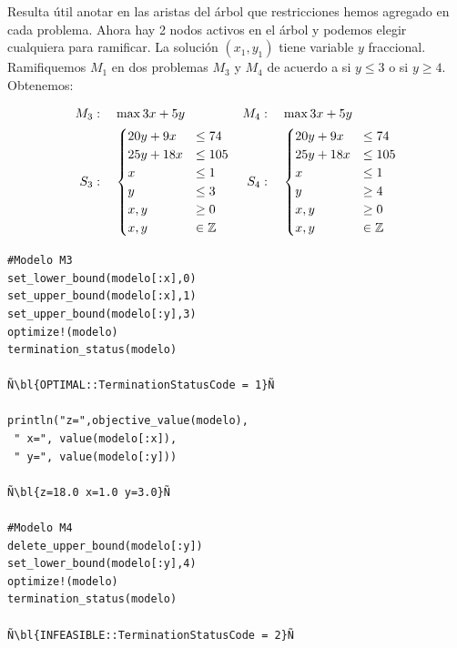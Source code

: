     \medskip
    
    Resulta útil anotar en las aristas del árbol que restricciones hemos agregado en cada problema. Ahora hay 2 nodos activos en el árbol y podemos elegir cualquiera para ramificar. La solución $(x_1,y_1)$ tiene variable $y$ fraccional. Ramifiquemos $M_1$ en dos problemas $M_3$ y $M_4$ de acuerdo a si $y\leq 3$ o si $y\geq 4$. Obtenemos:
    
    \begin{minipage}{0.4\textwidth}
    	\begin{align*}
    	M_3&:\quad 	\max 3x+5y & M_4&:\quad 	\max 3x+5y\\ 
    	S_3&:\quad \begin{cases}
    	20y+9x&\leq 74\\
    	25y+18x&\leq 105\\
    	x&\leq 1\\
    	y&\leq 3\\
    	x,y&\geq 0\\
    	x,y&\in \mathbb Z\end{cases}&S_4&:\quad \begin{cases}
    	20y+9x&\leq 74\\
    	25y+18x&\leq 105\\
    	x&\leq 1\\
    	y&\geq 4\\
    	x,y&\geq 0\\
    	x,y&\in \mathbb Z\end{cases}
    	\end{align*}
    \end{minipage}		
    \begin{minipage}{0.6\textwidth}
    		\begin{lstlisting}[escapechar=Ñ]
#Modelo M3
set_lower_bound(modelo[:x],0)
set_upper_bound(modelo[:x],1) 
set_upper_bound(modelo[:y],3) 
optimize!(modelo)
termination_status(modelo)

Ñ\bl{OPTIMAL::TerminationStatusCode = 1}Ñ

println("z=",objective_value(modelo),
 " x=", value(modelo[:x]),
 " y=", value(modelo[:y]))

Ñ\bl{z=18.0 x=1.0 y=3.0}Ñ

#Modelo M4
delete_upper_bound(modelo[:y])
set_lower_bound(modelo[:y],4) 
optimize!(modelo)
termination_status(modelo)

Ñ\bl{INFEASIBLE::TerminationStatusCode = 2}Ñ
    		\end{lstlisting}
    \end{minipage}
    
